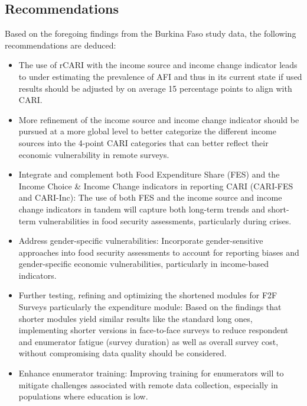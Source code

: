\documentclass[11pt,harvard]{article}
\begin{document}
	\subsection{Recommendations}
	Based on the foregoing findings from the Burkina Faso study data, the following recommendations are deduced:
	\begin{itemize}
		\item The use of rCARI with the income source and income change indicator leads to under estimating the prevalence of AFI and thus in its current state if used results should be adjusted by on average 15 percentage points to align with CARI.
		\item More refinement of the income source and income change indicator should be pursued at a more global level to better categorize the different income sources into the 4-point CARI categories that can better reflect their economic vulnerability in remote surveys.
		\item Integrate and complement both Food Expenditure Share (FES) and the Income Choice \& Income Change indicators in reporting CARI (CARI-FES and CARI-Inc): The use of both FES and the income source and income change indicators in tandem will capture both long-term trends and short-term vulnerabilities in food security assessments, particularly during crises.
		\item Address gender-specific vulnerabilities: Incorporate gender-sensitive approaches into food security assessments to account for reporting biases and gender-specific economic vulnerabilities, particularly in income-based indicators.
		\item Further testing, refining and optimizing the shortened modules for F2F Surveys particularly the expenditure module: Based on the findings that shorter modules yield similar results like the standard long ones, implementing shorter versions in face-to-face surveys to reduce respondent and enumerator fatigue (survey duration) as well as overall survey cost, without compromising data quality should be considered.
		\item Enhance enumerator training: Improving training for enumerators will to mitigate challenges associated with remote data collection, especially in populations where education is low.
		
	\end{itemize}	

	
	
	
	\pagebreak
	
	
\end{document}
